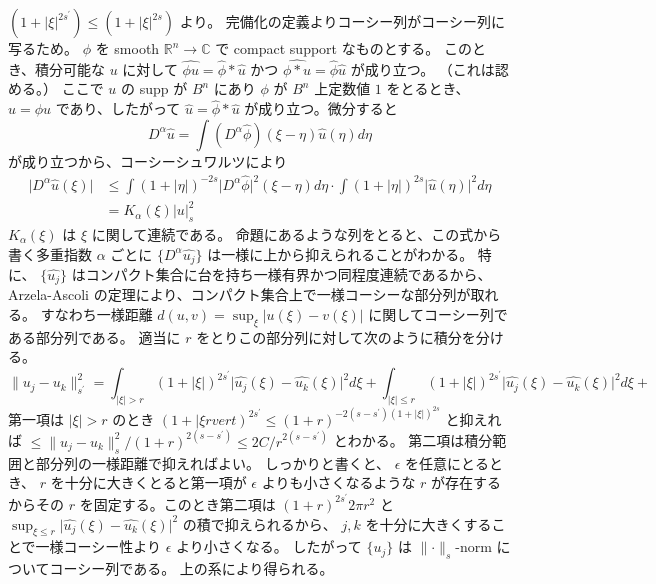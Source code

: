 \begin{Proof}
\itemprof
  \((1 + \lvert \xi \rvert^{2s^{\prime}}) \leq (1 + \lvert \xi \rvert^{2s})\) より。
  完備化の定義よりコーシー列がコーシー列に写るため。
\itemprof
  \(\phi\) を smooth \(\mathbb{R}^n \to \mathbb{C}\) で compact support なものとする。
  このとき、積分可能な \(u\) に対して
  \(\hat{\phi u} = \hat{\phi} * \hat{u}\) かつ \(\hat{\phi * u} = \hat{\phi} \hat{u}\) が成り立つ。
  （これは認める。）
  ここで \(u\) の supp が \(B^n\) にあり \(\phi\) が \(B^n\) 上定数値 \(1\) をとるとき、 \(u = \phi u\) であり、したがって \(\hat{u} = \hat{\phi} * \hat{u}\) が成り立つ。微分すると
  \[D^\alpha\hat{u} = \int (D^\alpha \hat{\phi})(\xi - \eta)\hat{u}(\eta) d \eta\]
  が成り立つから、コーシーシュワルツにより
  \begin{align*}
    \lvert D^\alpha \hat{u}(\xi) \rvert
    &\leq \int (1 + \lvert \eta \rvert)^{-2s} \lvert D^\alpha \hat{\phi} \rvert^2 (\xi - \eta) d \eta
    \cdot \int (1 + \lvert \eta \rvert)^{2s} \lvert \hat{u}(\eta) \rvert^2 d \eta \\
    &= K_{\alpha}(\xi) \lvert u \rvert_s^2
  \end{align*} %
  \(K_{\alpha}(\xi)\) は \(\xi\) に関して連続である。
  命題にあるような列をとると、この式から書く多重指数 \(\alpha\) ごとに \(\{D^\alpha \hat{u_j}\}\) は一様に上から抑えられることがわかる。
  特に、 \(\{\hat{u_j}\}\) はコンパクト集合に台を持ち一様有界かつ同程度連続であるから、 Arzela-Ascoli の定理により、コンパクト集合上で一様コーシーな部分列が取れる。
  すなわち一様距離 \(d(u,v) = \sup_{\xi} \lvert u(\xi) - v(\xi) \rvert\) に関してコーシー列である部分列である。
  適当に \(r\) をとりこの部分列に対して次のように積分を分ける。
  \[
    \lVert u_j - u_k \rVert_{s^\prime}^2 = \int_{\lvert \xi \rvert > r} (1 + \lvert \xi \rvert)^{2s^{\prime}} \lvert \hat{u_j}(\xi) - \hat{u_k}(\xi) \rvert^2 d \xi + \int_{\lvert \xi \rvert \leq r} (1 + \lvert \xi \rvert)^{2s^{\prime}} \lvert \hat{u_j}(\xi) - \hat{u_k}(\xi) \rvert^2 d \xi +
  \]
  第一項は \(\lvert \xi \rvert > r\) のとき \((1 + \lvert \xi rvert)^{2s^\prime} \leq (1 + r)^{-2(s-s^\prime) (1 + \lvert \xi \rvert)^{2s}}\) と抑えれば \(\leq \lVert u_j - u_k \rVert_s^2 / (1 + r)^{2(s-s^\prime)} \leq 2C / r^{2(s-s^\prime)}\) とわかる。
  第二項は積分範囲と部分列の一様距離で抑えればよい。
  しっかりと書くと、 \(\epsilon\) を任意にとるとき、 \(r\) を十分に大きくとると第一項が \(\epsilon\) よりも小さくなるような \(r\) が存在するからその \(r\) を固定する。このとき第二項は \((1 + r)^{2s^\prime} 2 \pi r^2\) と \(\sup_{\xi \leq r} \lvert \hat{u_j}(\xi) - \hat{u_k}(\xi) \rvert^2\) の積で抑えられるから、 \(j,k\) を十分に大きくすることで一様コーシー性より \(\epsilon\) より小さくなる。
  したがって \(\{u_j\}\) は \(\lVert \cdot \rVert_s\)-norm についてコーシー列である。
\itemprof
  上の系により得られる。
\end{Proof}

